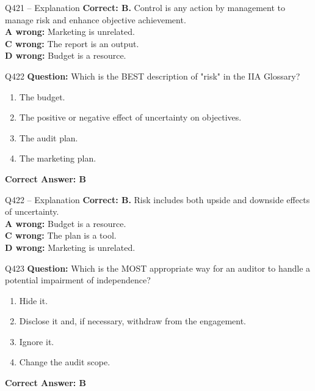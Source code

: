 \documentclass[aspectratio=169,10pt]{beamer}
\begin{document}
	\begin{frame}[t]{Q421 -- Explanation}
		\small
		\textbf{Correct: B.} Control is any action by management to manage risk and enhance objective achievement. \\[4pt]
		\textbf{A wrong:} Marketing is unrelated. \\[2pt]
		\textbf{C wrong:} The report is an output. \\[2pt]
		\textbf{D wrong:} Budget is a resource.
	\end{frame}
	
	\begin{frame}[t]{Q422}
		\small
		\textbf{Question:} Which is the BEST description of "risk" in the IIA Glossary?
		\begin{enumerate}[label=\Alph*.,itemsep=1pt,topsep=2pt]
			\item The budget.
			\item The positive or negative effect of uncertainty on objectives.
			\item The audit plan.
			\item The marketing plan.
		\end{enumerate}
		\vspace{4pt}
		\textbf{Correct Answer: B}
	\end{frame}
	
	\begin{frame}[t]{Q422 -- Explanation}
		\small
		\textbf{Correct: B.} Risk includes both upside and downside effects of uncertainty. \\[4pt]
		\textbf{A wrong:} Budget is a resource. \\[2pt]
		\textbf{C wrong:} The plan is a tool. \\[2pt]
		\textbf{D wrong:} Marketing is unrelated.
	\end{frame}
	
	\begin{frame}[t]{Q423}
		\small
		\textbf{Question:} Which is the MOST appropriate way for an auditor to handle a potential impairment of independence?
		\begin{enumerate}[label=\Alph*.,itemsep=1pt,topsep=2pt]
			\item Hide it.
			\item Disclose it and, if necessary, withdraw from the engagement.
			\item Ignore it.
			\item Change the audit scope.
		\end{enumerate}
		\vspace{4pt}
		\textbf{Correct Answer: B}
	\end{frame}
	
\end{document}

